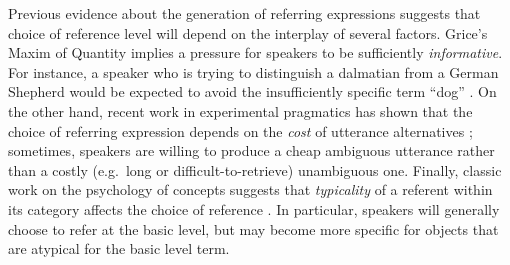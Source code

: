 \documentclass[10pt,letterpaper]{article}
\newcommand{\red}[1]{\textcolor{Red}{#1}}
\begin{document}
Previous evidence about the generation of referring expressions suggests that choice of reference level will depend on the interplay of several factors. 
Grice's Maxim of Quantity \cite{grice1975} implies a pressure for speakers to be sufficiently \emph{informative}.
For instance, a speaker who is trying to distinguish a dalmatian from a German Shepherd  would be expected to avoid the insufficiently specific term ``dog'' \cite{brennan1996}.
On the other hand, recent work in experimental pragmatics has shown that the choice of referring expression depends on the \emph{cost} of utterance alternatives \cite{rohde2012, degenfrankejaeger2013}; sometimes, speakers are willing to produce a cheap ambiguous utterance rather than a costly (e.g.~long or difficult-to-retrieve) unambiguous one. 
Finally, classic work on the psychology of concepts suggests that \emph{typicality} of a referent within its category affects the choice of reference \cite{RoschEtAl76_BasicLevel}. In particular, speakers will generally choose to refer at the basic level, but may become more specific for objects that are atypical for the basic level term.




%
%
\end{document}
